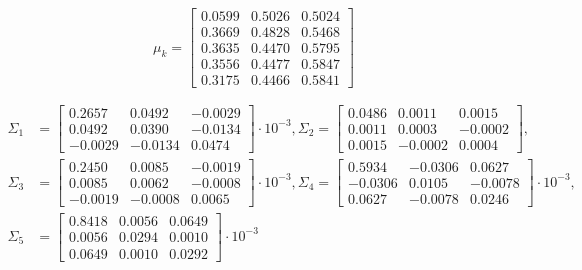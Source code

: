 \documentclass{ethz_report}
\begin{document}
\begin{equation}
    \mu_k = \begin{bmatrix}
        0.0599 & 0.5026 & 0.5024 \\
        0.3669 & 0.4828 & 0.5468 \\
        0.3635 & 0.4470 & 0.5795 \\
        0.3556 & 0.4477 & 0.5847 \\
        0.3175 & 0.4466 & 0.5841
    \end{bmatrix}
\end{equation}

\begin{equation}
    \begin{split}
        \Sigma_1&= \begin{bmatrix}
            0.2657 &  0.0492 & -0.0029 \\
            0.0492 &  0.0390 & -0.0134 \\
            -0.0029 & -0.0134 &  0.0474
        \end{bmatrix} \cdot 10^{-3},
        \Sigma_2= \begin{bmatrix}
            0.0486 &  0.0011 &  0.0015 \\
            0.0011 &  0.0003 & -0.0002 \\
            0.0015 & -0.0002 &  0.0004
        \end{bmatrix}, \\
        \Sigma_3&= \begin{bmatrix}
            0.2450 &  0.0085 & -0.0019 \\
            0.0085 &  0.0062 & -0.0008 \\
            -0.0019 & -0.0008 &  0.0065
        \end{bmatrix} \cdot 10^{-3},
        \Sigma_4= \begin{bmatrix}
            0.5934 & -0.0306 &  0.0627 \\
            -0.0306 &  0.0105 & -0.0078 \\
            0.0627 & -0.0078 &  0.0246
        \end{bmatrix} \cdot 10^{-3}, \\
        \Sigma_5&= \begin{bmatrix}
            0.8418 &  0.0056 &  0.0649 \\
            0.0056 &  0.0294 &  0.0010 \\
            0.0649 &  0.0010 &  0.0292
        \end{bmatrix} \cdot 10^{-3}
    \end{split}
\end{equation}
\end{document}
